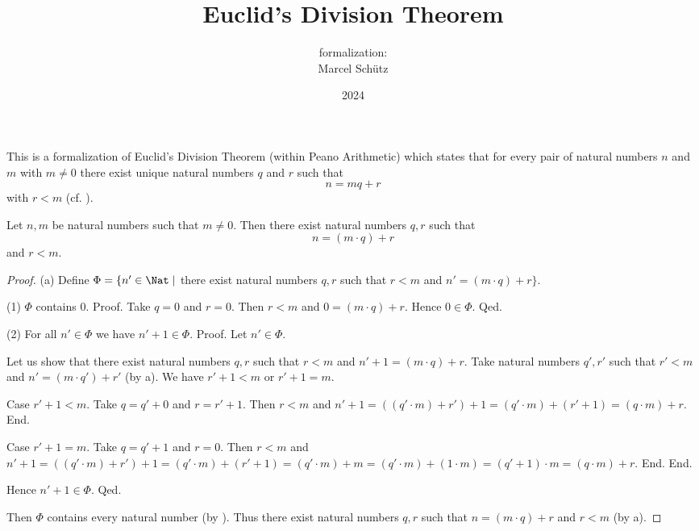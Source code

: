 \documentclass{article}
\title{Euclid's Division Theorem}
\author{\Naproche formalization:\\[0.5em]Marcel Schütz}
\date{2024}
\begin{document}
  \maketitle


  \noindent This is a formalization of Euclid's Division Theorem
  (within Peano Arithmetic) which states
  that for every pair of natural numbers $n$ and $m$ with $m \neq 0$ there
  exist unique natural numbers $q$ and $r$ such that
  \[n = mq + r\]
  with $r < m$  (cf. \cite[p. 17]{Burton2005}).

  \begin{forthel}
    \begin{theorem}[title=Euclid's Division Theorem: Existence,id=euclid_existence]
      Let $n, m$ be natural numbers such that $m \neq 0$.
      Then there exist natural numbers $q, r$ such that
      \[n = (m \cdot q) + r\]
      and $r < m$.
    \end{theorem}
    \begin{proof}
      (a) Define $\Phi = \{ n' \in \Nat \mid$ there exist natural numbers $q, r$ such that $r < m$ and $n' = (m \cdot q) + r \}$.

      (1) $\Phi$ contains $0$.
      Proof.
        Take $q = 0$ and $r = 0$.
        Then $r < m$ and $0 = (m \cdot q) + r$.
        Hence $0 \in \Phi$.
      Qed.

      (2) For all $n' \in \Phi$ we have $n' + 1 \in \Phi$.
      Proof.
        Let $n' \in \Phi$.

        Let us show that there exist natural numbers $q, r$ such that $r < m$ and $n' + 1 = (m \cdot q) + r$.
          Take natural numbers $q', r'$ such that $r' < m$ and $n' = (m \cdot q') + r'$ (by a).
          We have $r' + 1 < m$ or $r' + 1 = m$.

          Case $r' + 1 < m$.
            Take $q = q' + 0$ and $r = r' + 1$. %
            Then $r < m$ and $n' + 1
              = ((q' \cdot m) + r') + 1
              = (q' \cdot m) + (r' + 1)
              = (q \cdot m) + r$.
          End.

          Case $r' + 1 = m$.
            Take  $q = q' + 1$ and $r = 0$.
            Then $r < m$ and
            $n' + 1
              = ((q' \cdot m) + r') + 1
              = (q' \cdot m) + (r' + 1)
              = (q' \cdot m) + m
              = (q' \cdot m) + (1 \cdot m)
              = (q' + 1) \cdot m
              = (q \cdot m) + r$.
          End.
        End.

        Hence $n' + 1 \in \Phi$.
      Qed.

      Then $\Phi$ contains every natural number (by ).
      Thus there exist natural numbers $q, r$ such that $n = (m \cdot q) + r$ and $r < m$ (by a).
    \end{proof}
  \end{forthel}
\end{document}
